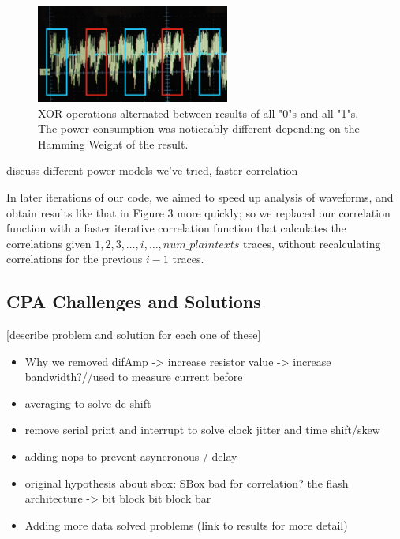 \documentclass[journal]{ieee_style}
\begin{document}
\begin{figure}[!t]
\centering
\includegraphics[width=2.5in]{XOR_PC}
\caption{XOR operations alternated between results of all "0"s and all "1"s. The power consumption was noticeably different depending on the Hamming Weight of the result.}
\label{fig_sim}
\end{figure}

 discuss different power models we've tried, faster correlation

 In later iterations of our code, we aimed to speed up analysis of waveforms, and obtain results like that in Figure 3 more quickly; so we replaced our correlation function with a faster iterative correlation function that calculates the correlations given $1,2,3,\ldots, i, \ldots, num\_plaintexts$ traces, without recalculating correlations for the previous $i-1$ traces.

\subsection{CPA Challenges and Solutions}
[describe problem and solution for each one of these]
\begin{itemize}
\item Why we removed difAmp -> increase resistor value -> increase bandwidth?//used to measure current before
\item averaging to solve dc shift
\item remove serial print and interrupt to solve clock jitter and time shift/skew
\item adding nops to prevent asyncronous / delay
\item original hypothesis about sbox:  SBox bad for correlation? the flash architecture -> bit block bit block bar
\item Adding more data solved problems (link to  results for more detail)
\end{itemize}
\end{document}
